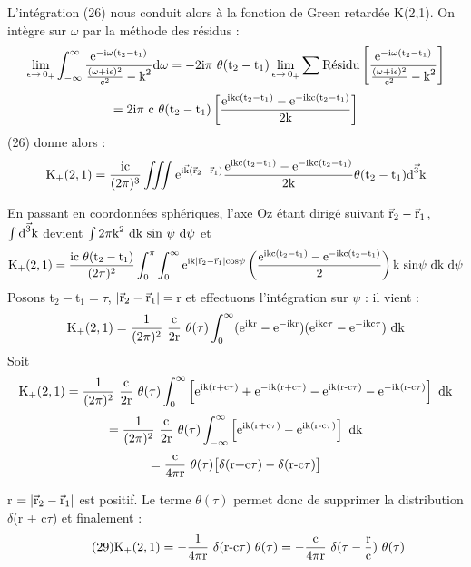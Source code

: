 L'intégration (26) nous conduit alors à la fonction de Green
retardée K(2,1). On intègre sur $\omega$ par la méthode des résidus :
\[
\lim_{\epsilon\to\,0_+}\int_{-\infty}^{\infty}\frac{\mt{e}^{-\mt{i}\omega(\mt{t}_2-\mt{t}_1)}}{\frac{(\omega+\mt{i}\epsilon)^2}{\mt{c}^2}-\mt{k}^2}\mt{d}\omega=
-2\mt{i}\pi\ \theta(\mt{t}_2-\mt{t}_1)\lim_{\epsilon\to\,0_+}\sum\mt{Résidu}\left[\frac{\mt{e}^{-\mt{i}\omega(\mt{t}_2-\mt{t}_1)}}{\frac{(\omega+\mt{i}\epsilon)^2}{\mt{c}^2}-\mt{k}^2}\right]
\]
\[
=2\text{i}\pi\text{ c }\theta(\text{t}_2-\text{t}_1)\left[\frac{\text{e}^{\text{ikc}(\text{t}_2-\text{t}_1)}-\text{e}^{-\text{ikc}(\text{t}_2-\text{t}_1)}}{2\text{k}}\right]
\]
(26) donne alors :
\[
\text{K}_+(2,1)=\frac{\text{ic}}{(2\pi)^3}\iiint \text{e}^{\text{i}\vec{\text{k}}(\vec{\text{r}}_2-\vec{\text{r}}_1)}\frac{\text{e}^{\text{ikc}(\text{t}_2-\text{t}_1)}-\text{e}^{-\text{ikc}(\text{t}_2-\text{t}_1)}}{2\text{k}}\theta(\text{t}_2-\text{t}_1)\vec{\text{d}^3\text{k}}
\]

En passant en coordonnées sphériques, l'axe Oz étant dirigé suivant $\vec{\text{r}}_2-\vec{\text{r}}_1$, $\int\vec{\text{d}^3\text{k}}$
 devient $\int2\pi\text{k}^2\text{ dk}\text{ sin }\psi\text{ d}\psi$ et
\[
\text{K}_+(2,1)=\frac{\text{ic }\theta(\text{t}_2-\text{t}_1)}{(2\pi)^2}\int_0^\pi\int_0^\infty \text{e}^{\text{ik}|\vec{\text{r}}_2-\vec{\text{r}}_1|\text{cos}\psi}\left(\frac{\text{e}^{\text{ikc}(\text{t}_2-\text{t}_1)}-\text{e}^{-\text{ikc}(\text{t}_2-\text{t}_1)}}{2}\right)\text{k sin}\psi\text{ dk d}\psi
\]
Posons t$_2-$t$_1=\tau$, $|\vec{\text{r}}_2-\vec{\text{r}}_1|=\,$r et effectuons l'intégration sur $\psi$ : il
vient :
\[
\mt{K}_+(2,1)=\frac{1}{(2\pi)^2}\ \frac{\mt{c}}{2\mt{r}}\ \theta(\tau) \int_0^\infty (\mt{e}^{\mt{ikr}}-\mt{e}^{-\mt{ikr}}) (\mt{e}^{\mt{ikc}\tau}-\mt{e}^{-\mt{ikc}\tau})\mt{ dk}
\]
Soit
\[
\mt{K}_+(2,1)=\frac{1}{(2\pi)^2}\ \frac{\mt{c}}{2\mt{r}}\ \theta(\tau) \int_0^\infty \left[\mt{e}^{\mt{ik(r+c}\tau)}+\mt{e}^{-\mt{ik(r+c}\tau)}-\mt{e}^{\mt{ik(r-c}\tau)}-\mt{e}^{-\mt{ik(r-c}\tau)}\right]\mt{ dk}
\]
\[
=\frac{1}{(2\pi)^2}\ \frac{\mt{c}}{2\mt{r}}\ \theta(\tau) \int_{-\infty}^\infty \left[\mt{e}^{\mt{ik(r+c}\tau)}-\mt{e}^{\mt{ik(r-c}\tau)}\right]\mt{ dk}
\]
\[
=\frac{\mt{c}}{4\pi\mt{r}}\ \theta(\tau) \big[\delta(\mt{r+c}\tau)-\delta(\mt{r-c}\tau)\big]
\]

r $=|\vec{\text{r}}_2-\vec{\text{r}}_1|$ est positif. Le terme $\theta(\tau)$ permet donc de supprimer la
distribution $\delta$(r + c$\tau$) et finalement :
\[
\tag{29}\mt{K}_+(2,1)=-\frac{\mt{1}}{4\pi\mt{r}}\ \delta(\mt{r-c}\tau)\ \theta(\tau)=-\frac{\mt{c}}{4\pi\mt{r}}\ \delta(\tau-\frac{\mt{r}}{\mt{c}})\ \theta(\tau)
\]

